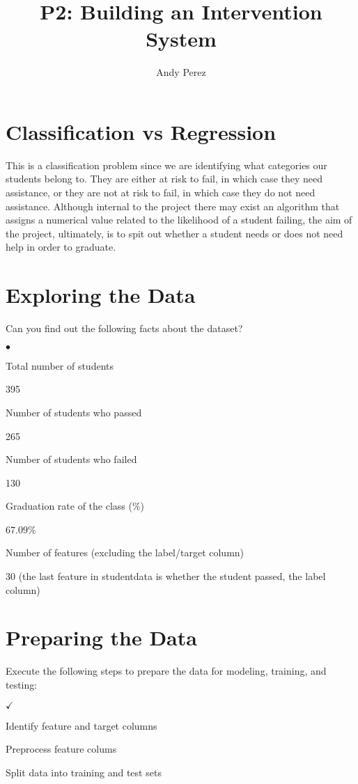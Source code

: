 \documentclass{amsart}
\begin{document}
\title{P2: Building an Intervention System}
\author{Andy Perez}
\maketitle
\section{Classification vs Regression}
This is a classification problem since we are identifying what categories our students belong to.  They are either at risk to fail, in which case they need assistance, or they are not at risk to fail, in which case they do not need assistance.  Although internal to the project there may exist an algorithm that assigns a numerical value related to the likelihood of a student failing, the aim of the project, ultimately, is to spit out whether a student needs or does not need help in order to graduate.

\section{Exploring the Data}
Can you find out the following facts about the dataset?
\begin{list}{$\bullet$}{\addtolength{\parsep}{1mm}}
	\item Total number of students 
	
	395
	\item Number of students who passed 
	
	265
	\item Number of students who failed

	130

	\item Graduation rate of the class (\%) 

	67.09\%
	\item Number of features (excluding the label/target column)
 
	30 (the last feature in student\textunderscore data is whether the student passed, the label column)
\end{list}
\section{Preparing the Data}

Execute the following steps to prepare the data for modeling, training, and testing:

\begin{list}{$\checkmark$}{\addtolength{\parsep}{1mm}}
	\item Identify feature and target columns

	\item Preprocess feature colums

	\item Split data into training and test sets
\end{list}
\end{document}
